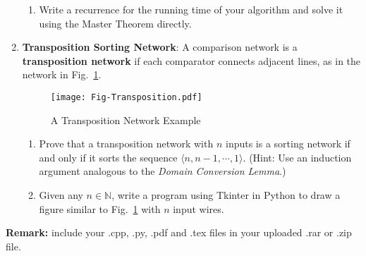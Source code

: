 \documentclass[12pt,a4paper]{article}
\makeatletter
\newtheorem*{solution}{Solution}
\theoremstyle{definition}
\renewenvironment{solution}[1][Solution] {\par\pushQED{\qed}\normalfont\topsep6\p@\@plus6\p@\relax\trivlist\item[\hskip\labelsep\bfseries#1\@addpunct{.}]\ignorespaces}{\popQED\endtrivlist\@endpefalse} \makeatother
\makeatother
\begin{document}
\begin{enumerate}
\begin{enumerate}
        \item
        Write a recurrence for the running time of your algorithm and solve it using the Master Theorem directly.
    \end{enumerate}

    \item
    \textbf{Transposition Sorting Network}: A comparison network is a \textbf{transposition network}  if each comparator connects adjacent lines, as in the network in Fig.~\ref{Fig-Transposition}.

    \begin{figure}[htbp]
        \centering
        \texttt{[image: Fig-Transposition.pdf]}
        \caption{A Transposition Network Example}\label{Fig-Transposition}
    \end{figure}
    
    \begin{enumerate}
        \item
        Prove that a transposition network with $n$ inputs is a sorting network if and only if it sorts the sequence $\langle n, n-1, \cdots, 1 \rangle$. {\color{blue}(Hint: Use an induction argument analogous to the \emph{Domain Conversion Lemma}.)}

        \item
        {\color{red}{(Bonus)}} Given any $n \in \mathbb{N}$, write a program using Tkinter in Python to draw a figure similar to Fig.~\ref{Fig-Transposition} with $n$ input wires.
        
    \end{enumerate}

\end{enumerate}

\vspace{20pt}

\textbf{Remark:} include your .cpp, .py, .pdf and .tex files in your uploaded .rar or .zip file.

\end{document}
